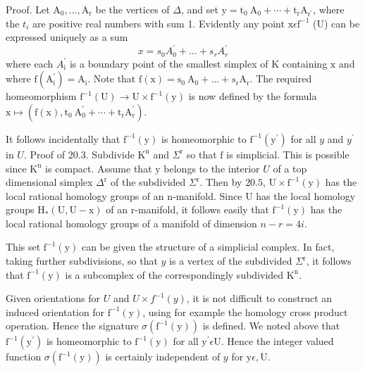 \documentclass[10pt]{article}
\begin{document}
Proof. Let $\mathrm{A}_{0}, \ldots, \mathrm{A}_{\mathrm{r}}$ be the vertices of $\Delta$, and set $\mathrm{y}=\mathrm{t}_{0} \mathrm{~A}_{0}+\cdots+\mathrm{t}_{\mathrm{r}} \mathrm{A}_{\mathrm{r}^{\prime}}$, where the $t_{i}$ are positive real numbers with sum 1. Evidently any point $\mathrm{x} \epsilon \mathrm{f}^{-1}$ (U) can be expressed uniquely as a sum
$$
x=s_{0} A_{0}^{\prime}+\ldots+s_{r} A_{r}^{\prime}
$$
where each $A_{\mathrm{i}}^{\prime}$ is a boundary point of the smallest simplex of $\mathrm{K}$ containing $\mathrm{x}$ and where $\mathrm{f}\left(\mathrm{A}_{\mathrm{i}}^{\prime}\right)=\mathrm{A}_{\mathrm{i}}$. Note that $\mathrm{f}(\mathrm{x})=\mathrm{s}_{0} \mathrm{~A}_{0}+\ldots+s_{\mathrm{r}} \mathrm{A}_{\mathrm{r}}$. The required homeomorphism $\mathrm{f}^{-1}(\mathrm{U}) \rightarrow \mathrm{U} \times \mathrm{f}^{-1}(\mathrm{y})$ is now defined by the formula $\mathrm{x} \mapsto\left(\mathrm{f}(\mathrm{x}), \mathrm{t}_{0} \mathrm{~A}_{0}^{\prime}+\cdots+\mathrm{t}_{\mathrm{r}} \mathrm{A}_{\mathrm{r}}^{\prime}\right)$.

It follows incidentally that $\mathrm{f}^{-1}(\mathrm{y})$ is homeomorphic to $\mathrm{f}^{-1}\left(\mathrm{y}^{\prime}\right)$ for all $y$ and $y^{\prime}$ in $U$. Proof of 20.3. Subdivide $\mathrm{K}^{\mathrm{n}}$ and $\Sigma^{\mathrm{r}}$ so that $\mathrm{f}$ is simplicial. This is possible since $\mathrm{K}^{\mathrm{n}}$ is compact. Assume that $\mathrm{y}$ belongs to the interior $U$ of a top dimensional simplex $\Delta^{\mathrm{r}}$ of the subdivided $\Sigma^{\mathrm{r}}$. Then by $20.5$, $\mathrm{U} \times \mathrm{f}^{-1}(\mathrm{y})$ has the local rational homology groups of an $\mathrm{n}$-manifold. Since $\mathrm{U}$ has the local homology groups $\mathrm{H}_{*}(\mathrm{U}, \mathrm{U}-\mathrm{x})$ of an $\mathrm{r}$-manifold, it follows easily that $\mathrm{f}^{-1}(\mathrm{y})$ has the local rational homology groups of a manifold of dimension $n-r=4 i$.

This set $\mathrm{f}^{-1}(\mathrm{y})$ can be given the structure of a simplicial complex. In fact, taking further subdivisions, so that $y$ is a vertex of the subdivided $\Sigma^{\mathrm{r}}$, it follows that $\mathrm{f}^{-1}(\mathrm{y})$ is a subcomplex of the correspondingly subdivided $\mathrm{K}^{\mathrm{n}}$.

Given orientations for $U$ and $U \times f^{-1}(y)$, it is not difficult to construct an induced orientation for $\mathrm{f}^{-1}(\mathrm{y})$, using for example the homology cross product operation. Hence the signature $\sigma\left(\mathrm{f}^{-1}(\mathrm{y})\right)$ is defined. We noted above that $\mathrm{f}^{-1}\left(\mathrm{y}^{\prime}\right)$ is homeomorphic to $\mathrm{f}^{-1}(\mathrm{y})$ for all $\mathrm{y}^{\prime} \epsilon \mathrm{U}$. Hence the integer valued function $\sigma\left(\mathrm{f}^{-1}(\mathrm{y})\right)$ is certainly independent of $y$ for $\mathrm{y} \epsilon, \mathrm{U}$.
\end{document}

